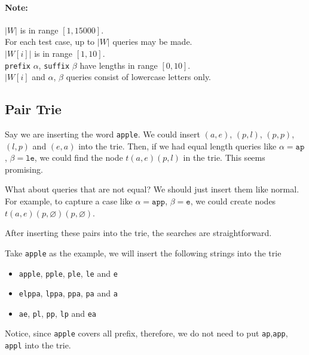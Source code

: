 \paragraph{Note:}
\begin{flushleft}
$|W|$ is in range $[1, 15000]$.
\\
For each test case, up to $|W|$ queries may be made.
\\
$|W[i]|$ is in range $[1, 10]$.
\\
\texttt{prefix} $\alpha$, \texttt{suffix} $\beta$ have lengths in range $[0, 10]$.
\\
$|W[i]$ and $\alpha$, $\beta$ queries consist of lowercase letters only.
\end{flushleft}
\subsection{Pair Trie}
Say we are inserting the word \texttt{apple}. We could insert $(a, e)$, $(p, l)$, $(p, p)$, $(l, p)$ and $(e, a)$ into the trie. Then, if we had equal length queries like $\alpha = \texttt{ap}$, $\beta = \texttt{le}$, we could find the node $t(a, e)(p, l)$ in the trie. This seems promising.
\par
What about queries that are not equal? We should just insert them like normal. For example, to capture a case like $\alpha = \texttt{app}$, $\beta = \texttt{e}$, we could create nodes $t(a, e)(p, \varnothing)(p, \varnothing)$.
\par
After inserting these pairs into the trie, the searches are straightforward.
\par
Take \texttt{apple} as the example, we will insert the following strings into the trie
\begin{itemize}
\item \texttt{apple}, \texttt{pple}, \texttt{ple}, \texttt{le} and \texttt{e}
\item \texttt{elppa}, \texttt{lppa}, \texttt{ppa}, \texttt{pa} and \texttt{a}
\item \texttt{ae}, \texttt{pl}, \texttt{pp}, \texttt{lp} and \texttt{ea}
\end{itemize}
Notice, since \texttt{apple} covers all prefix, therefore, we do not need to put \texttt{ap},\texttt{app}, \texttt{appl} into the trie.
